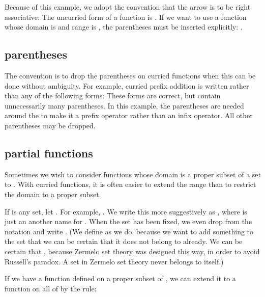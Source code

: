 \documentclass[cup9a]{cupbook}
\begin{document}
Because of this example, we adopt the convention that the arrow \mc{$\to$}
is to be right associative:
The uncurried form of a function  is .
If we want to use a function  whose domain is  and range is ,
the parentheses must be inserted explicitly: .

\subsection{parentheses}

The convention is to drop the parentheses on curried functions when this can be done without ambiguity.  For example, curried prefix addition is written
rather than any of the following forms:
These forms are correct, but contain unnecessarily many parentheses.
In this example, the parentheses are needed around the \mc{$(+)$} to make it
a prefix operator rather than an infix operator. All other parentheses may
be dropped.

\subsection{partial functions}

Sometimes we wish to consider functions whose domain is a proper subset of a set  to .  With curried functions, it is often easier to extend the range than to restrict the domain to a proper subset.

If  is any set, let .  For example,
.  We write this more suggestively
as , where  is just an
another name for .  When the set  has been fixed, we even drop
 from the notation and write .
(We define  as we do, because we want to add something to the set 
that we can be certain that it does not belong to  already.  We can
be certain that , because Zermelo set theory was designed this
way, in order to avoid Russell's paradox.  A set in Zermelo set theory
never belongs to itself.)

If we have a function  defined on a proper subset  of , we can
extend it to a function  on all of  by the rule:
\end{document}
